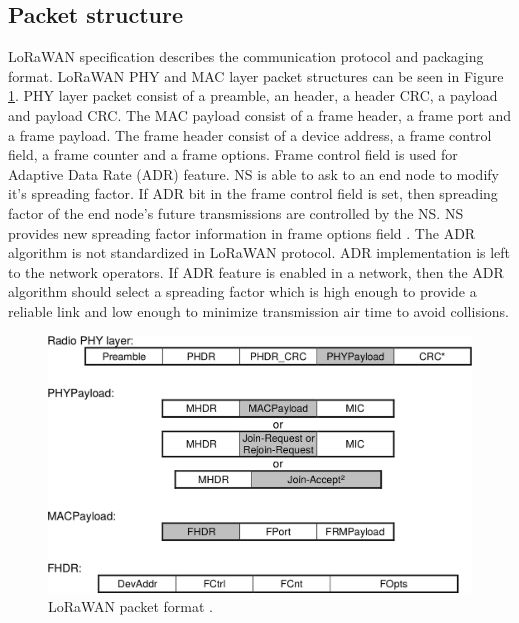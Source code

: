 \subsection{Packet structure}
LoRaWAN specification describes the communication protocol and packaging format. LoRaWAN PHY and MAC layer packet structures can be seen in Figure \ref{fig:lorawan_mac}. PHY layer packet consist of a preamble, an header, a header CRC, a payload and payload CRC. The MAC payload consist of a frame header, a frame port and a frame payload. The frame header consist of a device address, a frame control field, a frame counter and a frame options. Frame control field is used for Adaptive Data Rate (ADR) feature. NS is able to ask to an end node to modify it's spreading factor. If ADR bit in the frame control field is set, then spreading factor of the end node's future transmissions are controlled by the NS. NS provides new spreading factor information in frame options field \cite{lorawan.specification}. The ADR algorithm is not standardized in LoRaWAN protocol. ADR implementation is left to the network operators. If ADR feature is enabled in a network, then the ADR algorithm should select a spreading factor which is high enough to provide a reliable link and low enough to minimize transmission air time to avoid collisions.

\begin{figure}
\centering
\includegraphics[width=\linewidth]{fig/lorawan_mac.png}
\vspace*{4mm}
\caption{LoRaWAN packet format \cite{lorawan.specification}.}
\label{fig:lorawan_mac}
\end{figure}


